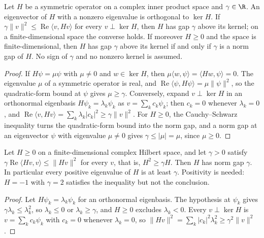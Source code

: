 \begin{lemma}
    \label{lem:gap_eigenvalue_forms}
    \leanok
    Let $H$ be a symmetric operator on a complex inner product space and $\gamma\in\R$.
    An eigenvector of $H$ with a nonzero eigenvalue is orthogonal to $\ker H$. If
    $\gamma\lVert v\rVert^2\le\operatorname{Re}\langle v,Hv\rangle$ for every
    $v\perp\ker H$, then $H$ has gap $\gamma$ above its kernel; on a finite-dimensional
    space the converse holds. If moreover $H\ge0$ and the space is finite-dimensional,
    then $H$ has gap $\gamma$ above its kernel if and only if $\gamma$ is a norm gap of
    $H$. No sign of $\gamma$ and no nonzero kernel is assumed.
\end{lemma}
\begin{proof}\leanok
    If $H\psi=\mu\psi$ with $\mu\neq0$ and $w\in\ker H$, then
    $\mu\langle w,\psi\rangle=\langle Hw,\psi\rangle=0$. The eigenvalue $\mu$ of a
    symmetric operator is real, and $\operatorname{Re}\langle\psi,H\psi\rangle=
        \mu\lVert\psi\rVert^2$, so the quadratic-form bound at $\psi$ gives $\mu\ge\gamma$.
    Conversely, expand $v\perp\ker H$ in an orthonormal eigenbasis $H\psi_k=\lambda_k\psi_k$
    as $v=\sum_kc_k\psi_k$; then $c_k=0$ whenever $\lambda_k=0$, and
    $\operatorname{Re}\langle v,Hv\rangle=\sum_k\lambda_k\lvert c_k\rvert^2
        \ge\gamma\lVert v\rVert^2$. For $H\ge0$, the Cauchy--Schwarz inequality turns the
    quadratic-form bound into the norm gap, and a norm gap at an eigenvector $\psi$ with
    eigenvalue $\mu\neq0$ gives $\gamma\le\lvert\mu\rvert=\mu$, since $\mu\ge0$.
\end{proof}

\begin{lemma}
    \label{lem:gap_quadratic_form_to_norm}
    \leanok
    Let $H\ge0$ on a finite-dimensional complex Hilbert space, and let $\gamma>0$
    satisfy $\gamma\operatorname{Re}\langle Hv,v\rangle\le\lVert Hv\rVert^2$ for every
    $v$, that is, $H^2\ge\gamma H$. Then $H$ has norm gap $\gamma$. In particular every
    positive eigenvalue of $H$ is at least $\gamma$. Positivity is needed: $H=-1$ with
    $\gamma=2$ satisfies the inequality but not the conclusion.
\end{lemma}
\begin{proof}\leanok
    Let $H\psi_k=\lambda_k\psi_k$ for an orthonormal eigenbasis. The hypothesis at
    $\psi_k$ gives $\gamma\lambda_k\le\lambda_k^2$, so $\lambda_k\le0$ or
    $\lambda_k\ge\gamma$, and $H\ge0$ excludes $\lambda_k<0$. Every $v\perp\ker H$ is
    $v=\sum_kc_k\psi_k$ with $c_k=0$ whenever $\lambda_k=0$, so
    $\lVert Hv\rVert^2=\sum_k\lvert c_k\rvert^2\lambda_k^2\ge\gamma^2\lVert v\rVert^2$.
\end{proof}


